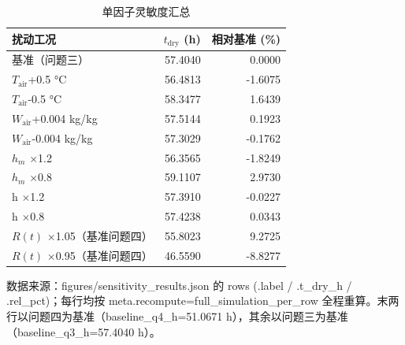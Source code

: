 \begin{table}[H]
  \centering
  \caption{单因子灵敏度汇总}
  \label{tab:sensitivity}
  \begin{tabular}{lrr}
    \toprule
    扰动工况 & $t_{\mathrm{dry}}$ (h) & 相对基准 (\%) \\
    \midrule
    基准（问题三） & 57.4040 & 0.0000 \\
    $T_{\mathrm{air}}$+0.5 °C & 56.4813 & -1.6075 \\
    $T_{\mathrm{air}}$-0.5 °C & 58.3477 & 1.6439 \\
    $W_{\mathrm{air}}$+0.004 kg/kg & 57.5144 & 0.1923 \\
    $W_{\mathrm{air}}$-0.004 kg/kg & 57.3029 & -0.1762 \\
    $h_m$ $\times$1.2 & 56.3565 & -1.8249 \\
    $h_m$ $\times$0.8 & 59.1107 & 2.9730 \\
    h $\times$1.2 & 57.3910 & -0.0227 \\
    h $\times$0.8 & 57.4238 & 0.0343 \\
    $R(t)$ $\times$1.05（基准问题四） & 55.8023 & 9.2725 \\
    $R(t)$ $\times$0.95（基准问题四） & 46.5590 & -8.8277 \\
    \bottomrule
  \end{tabular}
  \par\vspace{2pt}\footnotesize 数据来源：figures/sensitivity\_results.json 的 rows (.label / .t\_dry\_h / .rel\_pct)；每行均按 meta.recompute=full\_simulation\_per\_row 全程重算。末两行以问题四为基准（baseline\_q4\_h=51.0671 h），其余以问题三为基准（baseline\_q3\_h=57.4040 h）。
\end{table}
